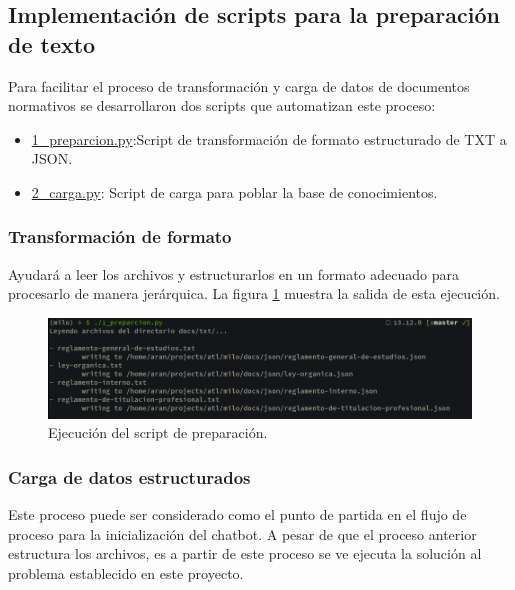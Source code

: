 \subsection{Implementación de scripts para la preparación de texto}

Para facilitar el proceso de transformación y carga de datos de documentos normativos se desarrollaron dos scripts que automatizan este proceso:

\begin{itemize}
    \item \href{https://github.com/AranGarcia/milo-bot/blob/master/1_preparcion.py}{1\_preparcion.py}:Script de transformación de formato estructurado de TXT a JSON.
    \item \href{https://github.com/AranGarcia/milo-bot/blob/master/2\_carga.py}{2\_carga.py}: Script de carga para poblar la base de conocimientos.
\end{itemize}

\subsubsection{Transformación de formato}
 
 Ayudará a leer los archivos y estructurarlos en un formato adecuado para procesarlo de manera jerárquica. La figura \ref{fig:script-preparacion} muestra la salida de esta ejecución.
 
\begin{figure}
    \centering
    \includegraphics[scale=0.475]{images/6/preparacion}
    \caption{Ejecución del script de preparación.}
    \label{fig:script-preparacion}
\end{figure}


\subsubsection{Carga de datos estructurados}

Este proceso puede ser considerado como el punto de partida en el flujo de proceso para la inicialización del chatbot. A pesar de que el proceso anterior estructura los archivos, es a partir de este proceso se ve ejecuta la solución al problema establecido en este proyecto.

